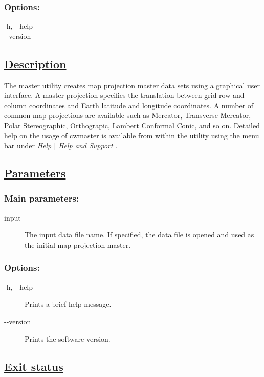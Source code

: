 \subsubsection*{Options:}


  -h, -{-}help \\ 
 -{-}version \\ 

\subsection*{\underline{Description}}


  The master utility creates map projection master data sets using a graphical user interface. A master projection specifies the translation between grid row and column coordinates and Earth latitude and longitude coordinates. A number of common map projections are available such as Mercator, Transverse Mercator, Polar Stereographic, Orthograpic, Lambert Conformal Conic, and so on. Detailed help on the usage of cwmaster is available from within the utility using the menu bar under \emph{Help $|$ Help and Support}
.
\subsection*{\underline{Parameters}}
\subsubsection*{Main parameters:}
\begin{description}
\item[input]The input data file name. If specified, the data file is opened and used as the initial map projection master.

\end{description}
\subsubsection*{Options:}
\begin{description}
\item[-h, -{-}help]Prints a brief help message.
\item[-{-}version]Prints the software version.

\end{description}
\subsection*{\underline{Exit status}}


